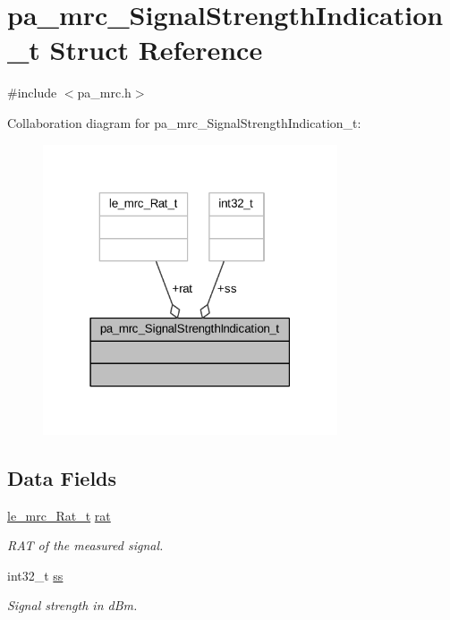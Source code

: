 \hypertarget{structpa__mrc___signal_strength_indication__t}{}\section{pa\+\_\+mrc\+\_\+\+Signal\+Strength\+Indication\+\_\+t Struct Reference}
\label{structpa__mrc___signal_strength_indication__t}


{\ttfamily \#include $<$pa\+\_\+mrc.\+h$>$}



Collaboration diagram for pa\+\_\+mrc\+\_\+\+Signal\+Strength\+Indication\+\_\+t\+:
\nopagebreak
\begin{figure}[H]
\begin{center}
\leavevmode
\includegraphics[width=247pt]{structpa__mrc___signal_strength_indication__t__coll__graph}
\end{center}
\end{figure}
\subsection*{Data Fields}
\begin{DoxyCompactItemize}
\item 
\hyperlink{le__mrc__interface_8h_aaf23906c37ad59fb96a8a48f7fab5b43}{le\+\_\+mrc\+\_\+\+Rat\+\_\+t} \hyperlink{structpa__mrc___signal_strength_indication__t_acbe1e5f253485ca33260e032e6e575b5}{rat}
\begin{DoxyCompactList}\small\item\em R\+AT of the measured signal. \end{DoxyCompactList}\item 
int32\+\_\+t \hyperlink{structpa__mrc___signal_strength_indication__t_a73f58b501a295db9ff6f24608be043ca}{ss}
\begin{DoxyCompactList}\small\item\em Signal strength in d\+Bm. \end{DoxyCompactList}\end{DoxyCompactItemize}


